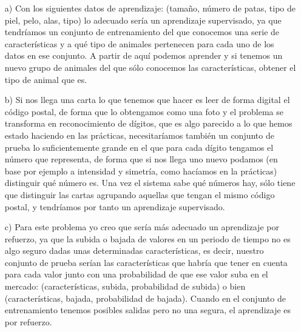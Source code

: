 \documentclass[12pt]{article}
\theoremstyle{definition}
\begin{document}
\begin{pregunta}
\begin{enumerate}
\item[a)] Con los siguientes datos de aprendizaje: (tamaño, número de patas, tipo de piel, pelo, alas, tipo) lo adecuado sería un aprendizaje supervisado, ya que tendríamos un conjunto de entrenamiento del que conocemos una serie de características y a qué tipo de animales pertenecen para cada uno de los datos en ese conjunto. A partir de aquí podemos aprender y si tenemos un nuevo grupo de animales del que sólo conocemos las características, obtener el tipo de animal que es.
\item[b)] Si nos llega una carta lo que tenemos que hacer es leer de forma digital el código postal, de forma que lo obtengamos como una foto y el problema se transforma en reconocimiento de dígitos, que es algo parecido a lo que hemos estado haciendo en las prácticas, necesitaríamos también un conjunto de prueba lo suficientemente grande en el que para cada dígito tengamos el número que representa, de forma que si nos llega uno nuevo podamos (en base por ejemplo a intensidad y simetría, como hacíamos en la prácticas) distinguir qué número es. Una vez el sistema sabe qué números hay, sólo tiene que distinguir las cartas agrupando aquellas que tengan el mismo código postal, y tendríamos por tanto un aprendizaje supervisado.
\item[c)] Para este problema yo creo que sería más adecuado un aprendizaje por refuerzo, ya que la subida o bajada de valores en un periodo de tiempo no es algo seguro dadas unas determinadas características, es decir, nuestro conjunto de prueba serían las características que habría que tener en cuenta para cada valor junto con una probabilidad de que ese valor suba en el mercado: (características, subida, probabilidad de subida) o bien (características, bajada, probabilidad de bajada). Cuando en el conjunto de entrenamiento tenemos posibles salidas pero no una segura, el aprendizaje es por refuerzo.
\end{enumerate}

\end{pregunta}
\end{document}
